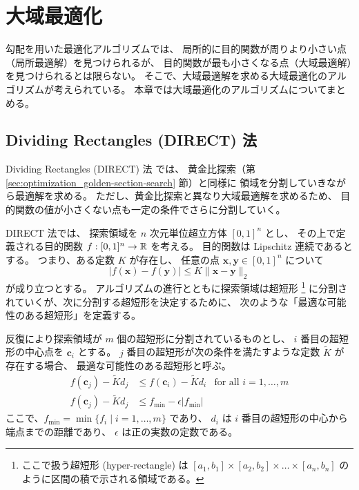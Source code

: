 %

\chapter{大域最適化}

勾配を用いた最適化アルゴリズムでは、
局所的に目的関数が周りより小さい点（局所最適解）を見つけられるが、
目的関数が最も小さくなる点（大域最適解）を見つけられるとは限らない。
そこで、大域最適解を求める大域最適化のアルゴリズムが考えられている。
本章では大域最適化のアルゴリズムについてまとめる。

\section{Dividing Rectangles (DIRECT) 法}\label{sec:optimization_direct}

Dividing Rectangles (DIRECT) 法 \cite{Jones1993} では、
黄金比探索（第 \ref{sec:optimization_golden-section-search} 節）と同様に
領域を分割していきながら最適解を求める。
ただし、黄金比探索と異なり大域最適解を求めるため、
目的関数の値が小さくない点も一定の条件でさらに分割していく。

DIRECT 法では、
探索領域を $n$ 次元単位超立方体 $[0, 1]^n$ とし、
その上で定義される目的関数 $f : [0, 1]^n \to \mathbb{R}$ を考える。
目的関数は Lipschitz 連続であるとする。
つまり、ある定数 $K$ が存在し、
任意の点 $\bm{x}, \bm{y} \in [0, 1]^n$ について
\begin{equation}
    |f(\bm{x}) - f(\bm{y})| \le K \|\bm{x} - \bm{y}\|_2
\end{equation}
が成り立つとする。
アルゴリズムの進行とともに探索領域は超短形
\footnote{ここで扱う超短形 (hyper-rectangle) は%
$[a_1, b_1] \times [a_2, b_2] \times \ldots \times [a_n, b_n]$%
のように区間の積で示される領域である。}
に分割されていくが、次に分割する超短形を決定するために、
次のような「最適な可能性のある超短形」を定義する。

\begin{definition}
    \label{def:optimization_direct_potentially-optimal}
    反復により探索領域が $m$ 個の超短形に分割されているものとし、
    $i$ 番目の超短形の中心点を $\bm{c}_i$ とする。
    $j$ 番目の超短形が次の条件を満たすような定数 $\tilde{K}$ が存在する場合、
    最適な可能性のある超短形と呼ぶ。
    \begin{align}
        f(\bm{c}_j) - \tilde{K} d_j &\le f(\bm{c}_i) - \tilde{K} d_i & \text{for all $i = 1, \ldots, m$}
        \label{eq:optimization_direct_potentially-optimal_smaller-than-others}
        \\
        f(\bm{c}_j) - \tilde{K} d_j &\le f_{\text{min}} - \epsilon |f_{\text{min}}|
        \label{eq:optimization_direct_potentially-optimal_smaller-than-now}
    \end{align}
    ここで、$f_{\text{min}} = \min{\{f_i \mid i = 1, \ldots, m\}}$ であり、
    $d_i$ は $i$ 番目の超短形の中心から端点までの距離であり、
    $\epsilon$ は正の実数の定数である。
\end{definition}

